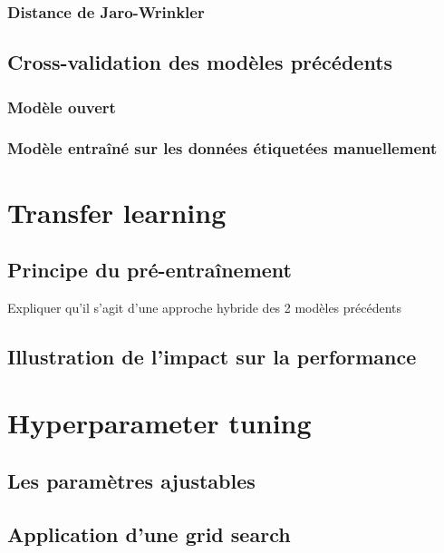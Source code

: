             \subsection{Distance de Jaro-Wrinkler}
    
        \section{Cross-validation des modèles précédents}
            
            \subsection{Modèle \og ouvert \fg}

            \subsection{Modèle entraîné sur les données étiquetées manuellement}

    \chapter{Transfer learning}
        
        \section{Principe du pré-entraînement}
        
        Expliquer qu'il s'agit d'une approche hybride des 2 modèles précédents

        \section{Illustration de l'impact sur la performance}


    \chapter{Hyperparameter tuning}
            
        \section{Les paramètres ajustables}

        \section{Application d'une grid search}